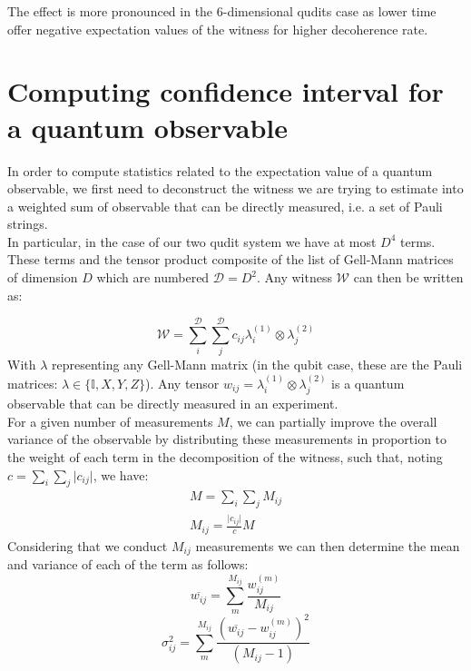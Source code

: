 \documentclass[%
 12pt,
 superscriptaddress,
 amsmath,
 amssymb,
 onecolumn,
 longbibliography
]{revtex4-2}
\begin{document}
\begin{appendices}
\indent The effect is more pronounced in the 6-dimensional qudits case as lower time offer negative expectation values of the witness for higher decoherence rate. 

\section{Computing confidence interval for a quantum observable} \label{sec:stats}

\indent In order to compute statistics related to the expectation value of a quantum observable, we first need to deconstruct the witness we are trying to estimate into a weighted sum of observable that can be directly measured, i.e. a set of Pauli strings. \\
\indent In particular, in the case of our two qudit system we have at most $D^4$ terms. These terms and the tensor product composite of the list of Gell-Mann matrices of dimension $D$ which are numbered $\mathcal{D} = D^2$. Any witness $\mathcal{W}$ can then be written as: 

\begin{equation}
    \mathcal{W} = \sum_i^\mathcal{D}\sum_j^\mathcal{D} c_{ij} \lambda_i^{(1)} \otimes \lambda_j^{(2)}
\end{equation}
\indent With $\lambda$ representing any Gell-Mann matrix (in the qubit case, these are the Pauli matrices: $\lambda \in \{\mathbb{I}, X, Y, Z \}$). Any tensor $w_{ij} = \lambda_i^{(1)} \otimes \lambda_j^{(2)}$ is a quantum observable that can be directly measured in an experiment. \\
\indent For a given number of measurements $M$, we can partially improve the overall variance of the observable by distributing these measurements in proportion to the weight of each term in the decomposition of the witness, such that, noting $c = \sum_i \sum_j \lvert c_{ij} \rvert$, we have: 
 \begin{align}
    M = \sum_i \sum_j M_{ij} \\
    M_{ij} =  \frac{\lvert c_{ij} \rvert}{c} M
\end{align}
\indent Considering that we conduct $M_{ij}$ measurements we can then determine the mean and variance of each of the term as follows: 
 \begin{equation}
    \overline{w_{ij}} = \sum_m^{M_{ij}} \frac{w_{ij}^{(m)}}{M_{ij}}
\end{equation}
 \begin{equation}
    \sigma_{ij}^2 = \sum_m^{M_{ij}} \frac{(\overline{w_{ij}} - w_{ij}^{(m)})^2}{(M_{ij} - 1)}
\end{equation}


\end{appendices}
\end{document}
